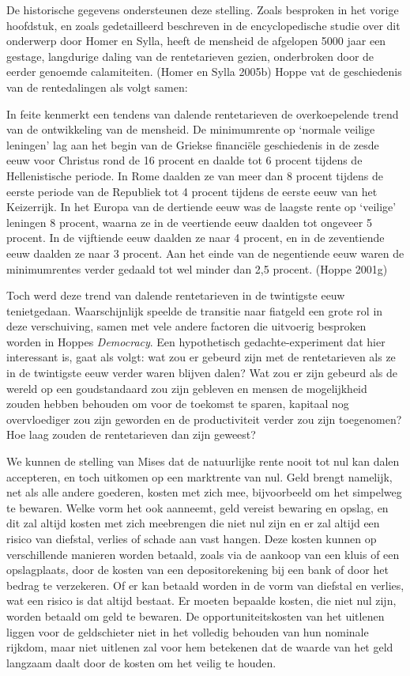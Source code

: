 \documentclass[
  a5paper,
  smalldemyvopaper,11pt,twoside,onecolumn,openright,extrafontsizes,
hidelinks]{memoir}
\begin{document}
De historische gegevens ondersteunen deze stelling. Zoals besproken in
het vorige hoofdstuk, en zoals gedetailleerd beschreven in de
encyclopedische studie over dit onderwerp door Homer en Sylla, heeft de
mensheid de afgelopen 5000 jaar een gestage, langdurige daling van de
rentetarieven gezien, onderbroken door de eerder genoemde calamiteiten.
(Homer en Sylla 2005b) Hoppe vat de geschiedenis van de rentedalingen
als volgt samen:

In feite kenmerkt een tendens van dalende rentetarieven de
overkoepelende trend van de ontwikkeling van de mensheid. De
minimumrente op `normale veilige leningen' lag aan het begin van de
Griekse financiële geschiedenis in de zesde eeuw voor Christus rond de
16 procent en daalde tot 6 procent tijdens de Hellenistische periode. In
Rome daalden ze van meer dan 8 procent tijdens de eerste periode van de
Republiek tot 4 procent tijdens de eerste eeuw van het Keizerrijk. In
het Europa van de dertiende eeuw was de laagste rente op `veilige'
leningen 8 procent, waarna ze in de veertiende eeuw daalden tot ongeveer
5 procent. In de vijftiende eeuw daalden ze naar 4 procent, en in de
zeventiende eeuw daalden ze naar 3 procent. Aan het einde van de
negentiende eeuw waren de minimumrentes verder gedaald tot wel minder
dan 2,5 procent. (Hoppe 2001g)

Toch werd deze trend van dalende rentetarieven in de twintigste eeuw
tenietgedaan. Waarschijnlijk speelde de transitie naar fiatgeld een
grote rol in deze verschuiving, samen met vele andere factoren die
uitvoerig besproken worden in Hoppes \emph{Democracy}. Een hypothetisch
gedachte-experiment dat hier interessant is, gaat als volgt: wat zou er
gebeurd zijn met de rentetarieven als ze in de twintigste eeuw verder
waren blijven dalen? Wat zou er zijn gebeurd als de wereld op een
goudstandaard zou zijn gebleven en mensen de mogelijkheid zouden hebben
behouden om voor de toekomst te sparen, kapitaal nog overvloediger zou
zijn geworden en de productiviteit verder zou zijn toegenomen? Hoe laag
zouden de rentetarieven dan zijn geweest?

We kunnen de stelling van Mises dat de natuurlijke rente nooit tot nul
kan dalen accepteren, en toch uitkomen op een marktrente van nul. Geld
brengt namelijk, net als alle andere goederen, kosten met zich mee,
bijvoorbeeld om het simpelweg te bewaren. Welke vorm het ook aanneemt,
geld vereist bewaring en opslag, en dit zal altijd kosten met zich
meebrengen die niet nul zijn en er zal altijd een risico van diefstal,
verlies of schade aan vast hangen. Deze kosten kunnen op verschillende
manieren worden betaald, zoals via de aankoop van een kluis of een
opslagplaats, door de kosten van een depositorekening bij een bank of
door het bedrag te verzekeren. Of er kan betaald worden in de vorm van
diefstal en verlies, wat een risico is dat altijd bestaat. Er moeten
bepaalde kosten, die niet nul zijn, worden betaald om geld te bewaren.
De opportuniteitskosten van het uitlenen liggen voor de geldschieter
niet in het volledig behouden van hun nominale rijkdom, maar niet
uitlenen zal voor hem betekenen dat de waarde van het geld langzaam
daalt door de kosten om het veilig te houden.
\end{document}

